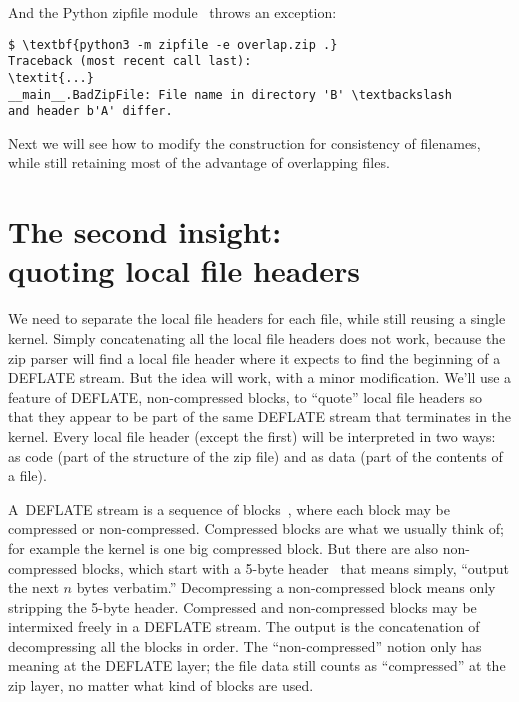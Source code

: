 \documentclass[letterpaper,twocolumn,10pt]{article}
\begin{document}
\noindent
And the Python zipfile module~\cite{python-zipfile}
throws an exception:

{\small
\begin{Verbatim}[commandchars=\\\{\}]
$ \textbf{python3 -m zipfile -e overlap.zip .}
Traceback (most recent call last):
\textit{...}
__main__.BadZipFile: File name in directory 'B' \textbackslash
and header b'A' differ.
\end{Verbatim}
}

Next we will see how to modify the construction
for consistency of filenames,
while still retaining most of the advantage
of overlapping files.



\section{The second insight:\texorpdfstring{\\}{ }quoting local file headers}
\label{sec:quote}

We need to separate the local file headers for each file,
while still reusing a single kernel.
Simply concatenating all the local file headers does not work,
because the zip parser will find a local file header
where it expects to find the beginning of a DEFLATE stream.
But the idea will work, with a minor modification.
We'll use a feature of DEFLATE, non-compressed blocks,
to ``quote'' local file headers
so that they appear to be part of the same DEFLATE stream
that terminates in the kernel.
Every local file header
(except the first)
will be interpreted in two ways:
as code (part of the structure of the zip file)
and as data (part of the contents of a file).

A~DEFLATE stream is a sequence of
blocks~\cite[\S 3.2.3]{rfc1951},
where each block may be compressed or non-compressed.
Compressed blocks are what we usually think of;
for example the kernel is one big compressed block.
But there are also non-compressed blocks,
which start with a
5-byte header~\cite[\S 3.2.4]{rfc1951}
that means simply, ``output the next $n$ bytes verbatim.''
Decompressing a non-compressed block means only stripping the 5-byte header.
Compressed and non-compressed blocks may be intermixed freely
in a DEFLATE stream.
The output is the concatenation of
decompressing all the blocks in order.
The ``non-compressed'' notion only has meaning at the DEFLATE layer;
the file data still counts as ``compressed'' at the zip layer,
no matter what kind of blocks are used.
\end{document}
